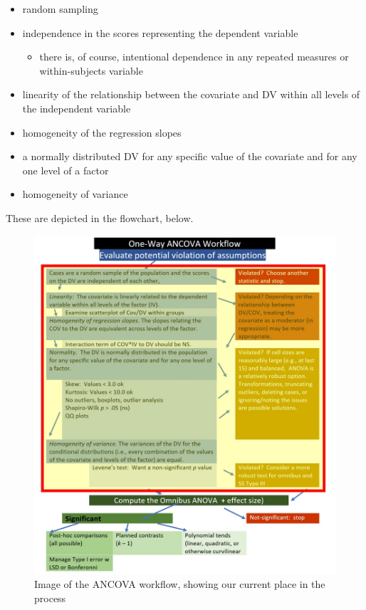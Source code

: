 \documentclass[
  11pt,
]{book}
\providecommand{\tightlist}{%
  \setlength{\itemsep}{0pt}\setlength{\parskip}{0pt}}
\begin{document}
\begin{itemize}
\tightlist
\item
  random sampling
\item
  independence in the scores representing the dependent variable

  \begin{itemize}
  \tightlist
  \item
    there is, of course, intentional dependence in any repeated measures or within-subjects variable
  \end{itemize}
\item
  linearity of the relationship between the covariate and DV within all levels of the independent variable
\item
  homogeneity of the regression slopes
\item
  a normally distributed DV for any specific value of the covariate and for any one level of a factor
\item
  homogeneity of variance
\end{itemize}

These are depicted in the flowchart, below.

\begin{figure}
\centering
\includegraphics{images/ANCOVA/wf_ANCOVA_assumptions.jpg}
\caption{Image of the ANCOVA workflow, showing our current place in the process}
\end{figure}
\end{document}
